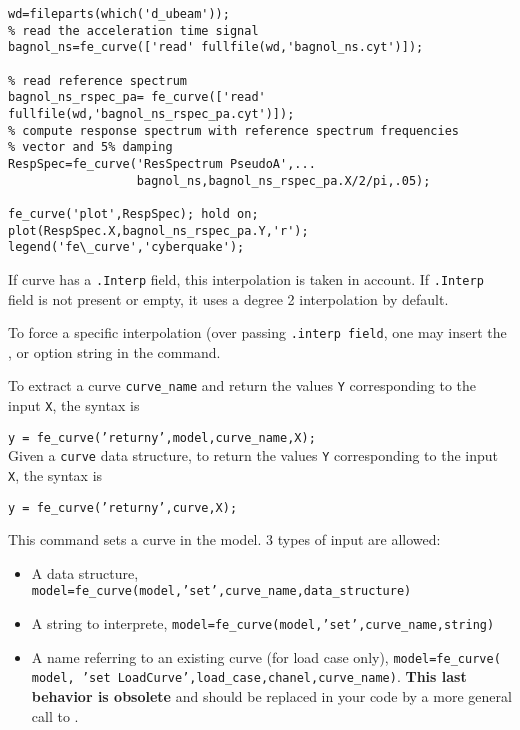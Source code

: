 \begin{verbatim}
wd=fileparts(which('d_ubeam'));
% read the acceleration time signal
bagnol_ns=fe_curve(['read' fullfile(wd,'bagnol_ns.cyt')]);

% read reference spectrum
bagnol_ns_rspec_pa= fe_curve(['read' fullfile(wd,'bagnol_ns_rspec_pa.cyt')]);
% compute response spectrum with reference spectrum frequencies
% vector and 5% damping
RespSpec=fe_curve('ResSpectrum PseudoA',...
                  bagnol_ns,bagnol_ns_rspec_pa.X/2/pi,.05);

fe_curve('plot',RespSpec); hold on;
plot(RespSpec.X,bagnol_ns_rspec_pa.Y,'r');
legend('fe\_curve','cyberquake');
\end{verbatim}%



If curve has a {\tt .Interp} field, this interpolation is taken in account. If {\tt .Interp} field is not present or empty, it uses a degree 2 interpolation by default. 

To force a specific interpolation (over passing {\tt .interp field}, one may insert the ,  or  option string in the command. 

To extract a curve {\tt curve\_name} and return the values {\tt Y} corresponding to the input {\tt X}, the syntax is

{\tt y = fe\_curve('returny',model,curve\_name,X);} \\

Given a {\tt curve} data structure, to return the values {\tt Y} corresponding to the input {\tt X}, the syntax is

{\tt y = fe\_curve('returny',curve,X);} \\



This command sets a curve in the model. 3 types of input are allowed:

\begin{itemize}
\item A data structure, {\tt model=fe\_curve(model,'set',curve\_name,data\_structure)}

\item A string to interprete, {\tt model=fe\_curve(model,'set',curve\_name,string)}

\item A name referring to an existing curve (for load case only), {\tt model=fe\_curve( model, 'set LoadCurve',load\_case,chanel,curve\_name)}. {\bf This last behavior is obsolete} and should be replaced in your code by a more general call to .
\end{itemize}

